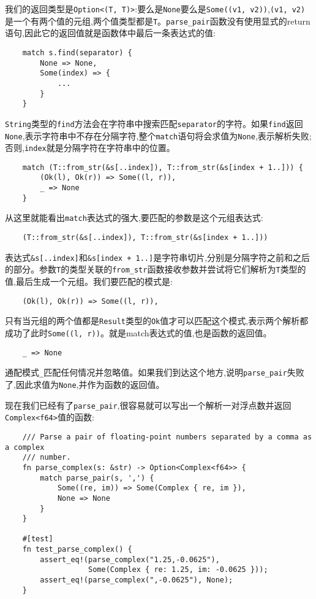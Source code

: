 我们的返回类型是\texttt{Option<(T, T)>}:要么是\texttt{None}要么是\texttt{Some((v1, v2))},\texttt{(v1, v2)}是一个有两个值的元组,两个值类型都是\texttt{T}。\texttt{parse\_pair}函数没有使用显式的return语句,因此它的返回值就是函数体中最后一条表达式的值:
\begin{verbatim}
    match s.find(separator) {
        None => None,
        Some(index) => {
            ...
        }
    }
\end{verbatim}

\texttt{String}类型的\texttt{find}方法会在字符串中搜索匹配\texttt{separator}的字符。如果\texttt{find}返回\texttt{None},表示字符串中不存在分隔字符,整个\texttt{match}语句将会求值为\texttt{None},表示解析失败;否则,\texttt{index}就是分隔字符在字符串中的位置。

\begin{verbatim}
    match (T::from_str(&s[..index]), T::from_str(&s[index + 1..])) {
        (Ok(l), Ok(r)) => Some((l, r)),
        _ => None
    }
\end{verbatim}

从这里就能看出\texttt{match}表达式的强大,要匹配的参数是这个元组表达式:
\begin{verbatim}
    (T::from_str(&s[..index]), T::from_str(&s[index + 1..]))
\end{verbatim}
表达式\texttt{\&s[..index]}和\texttt{\&s[index + 1..]}是字符串切片,分别是分隔字符之前和之后的部分。参数\texttt{T}的类型关联的\texttt{from\_str}函数接收参数并尝试将它们解析为\texttt{T}类型的值,最后生成一个元组。我们要匹配的模式是:
\begin{verbatim}
    (Ok(l), Ok(r)) => Some((l, r)),
\end{verbatim}

只有当元组的两个值都是\texttt{Result}类型的\texttt{Ok}值才可以匹配这个模式,表示两个解析都成功了此时\texttt{Some((l, r))}。就是match表达式的值,也是函数的返回值。

\begin{verbatim}
    _ => None
\end{verbatim}

通配模式\texttt{\_}匹配任何情况并忽略值。如果我们到达这个地方,说明\texttt{parse\_pair}失败了,因此求值为\texttt{None},并作为函数的返回值。

现在我们已经有了\texttt{parse\_pair},很容易就可以写出一个解析一对浮点数并返回\\
\texttt{Complex<f64>}值的函数:
\begin{verbatim}
    /// Parse a pair of floating-point numbers separated by a comma as a complex
    /// number.
    fn parse_complex(s: &str) -> Option<Complex<f64>> {
        match parse_pair(s, ',') {
            Some((re, im)) => Some(Complex { re, im }),
            None => None
        }
    }

    #[test]
    fn test_parse_complex() {
        assert_eq!(parse_complex("1.25,-0.0625"),
                   Some(Complex { re: 1.25, im: -0.0625 }));
        assert_eq!(parse_complex(",-0.0625"), None);
    }
\end{verbatim}

